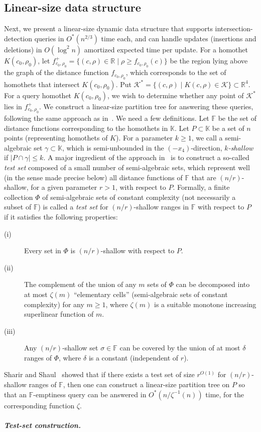 \documentclass[11pt]{article}
\newif\ifsocgproc
\def\reals{{\mathbb R}}
\def\Fspace{{\mathbb F}}
\def\Kspace{{\mathbb K}}
\def\K{\mathcal{K}}
\theoremstyle{definition}
\begin{document}
\subsection{Linear-size data structure}
\label{subsec:linear}
%
Next, we present a linear-size dynamic data structure that supports intersection-detection queries 
in $O^*(n^{2/3})$ time each, and can handle updates (insertions and deletions) in $O(\log^2 n)$ 
amortized expected time per update.
%
For a homothet $K(c_0,\rho_0)$, let $f_{c_0,\rho_0}^+ = \{(c,\rho) \in \reals \mid \rho \ge f_{c_0,\rho_0}(c) \}$ 
be the region lying above the graph of the distance function $f_{c_0,\rho_0}$, which corresponds to the set of 
homothets that intersect $K({c_0,\rho_0})$. Put $\K^* = \{(c,\rho) \mid K(c,\rho) \in\K\}\subset\reals^4$.
For a query homothet $K(c_0,\rho_0)$, we wish to determine whether any point of $\K^*$ 
lies in $f_{c_0,\rho_0}^+$. We construct a linear-size partition tree for answering these queries, 
following the same approach as in~\cite{AM95,Mat92,ShSh}. We need a few definitions. 
Let $\Fspace$ be the set of distance functions corresponding to the homothets in $\Kspace$.
Let $P \subset \Kspace$ be a set of $n$ points (representing homothets of $K$).
For a parameter $k\ge 1$, we call a semi-algebraic set 
$\gamma \subset \Kspace$, which is semi-unbounded in the $(-x_4)$-direction,
\emph{$k$-shallow} if $|P \cap \gamma| \le k$. 
A major ingredient of the approach in~\cite{Mat92,ShSh} is to construct a 
so-called \emph{test set} composed of a small number of semi-algebraic sets, which
represent well (in the sense made precise below) all distance functions of $\Fspace$ 
that are $(n/r)$-shallow, for a given parameter $r>1$, with respect to $P$. 
Formally, a finite collection $\Phi$ of semi-algebraic sets of constant complexity (not necessarily 
a subset of $\Fspace$) is called a \emph{test set} for $(n/r)$-shallow ranges in $\Fspace$ with 
respect to $P$ if it satisfies the following properties: 
%
\medskip
  \begin{description}
\item[(i)]
  Every set in $\Phi$ is $(n/r)$-shallow with respect to $P$. 
\item[(ii)]
  The complement of the union of any $m$ sets of $\Phi$ can be decomposed 
  into at most $\zeta(m)$ ``elementary cells'' (semi-algebraic sets of constant complexity) for any $m\ge 1$, 
  where $\zeta(m)$ is a suitable monotone increasing superlinear function of $m$. 
\item[(iii)]
  Any $(n/r)$-shallow set $\sigma\in \Fspace$ can be covered by the union 
  of at most $\delta$ ranges of $\Phi$, where $\delta$ is a constant (independent of $r$).
\end{description}
%
\medskip
Sharir and Shaul~\cite{ShSh} showed that if there exists a test set of size $r^{O(1)}$ for $(n/r)$-shallow 
ranges of $\Fspace$, then one can construct a linear-size partition tree on $P$ so that an
$\Fspace$-emptiness query can be answered in $O^*(n/\zeta^{-1}(n))$ time, for the corresponding function $\zeta$. 
%
\ifsocgproc 
\subparagraph*{Test-set construction.}
\else
\end{document}
